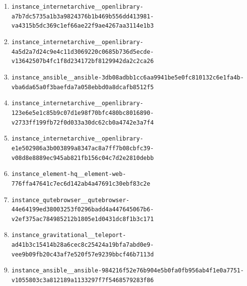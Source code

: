 \begin{enumerate}
\item \texttt{instance\_\allowbreak{}internetarchiv\allowbreak{}e\_\allowbreak{}\_\allowbreak{}openlibrary-\allowbreak{}a7b7dc5735a1b3\allowbreak{}a9824376b1b469\allowbreak{}b556dd413981-\allowbreak{}va4315b5dc369c\allowbreak{}1ef66ae22f9ae4\allowbreak{}267aa3114e1b3}
\item \texttt{instance\_\allowbreak{}internetarchiv\allowbreak{}e\_\allowbreak{}\_\allowbreak{}openlibrary-\allowbreak{}4a5d2a7d24c9e4\allowbreak{}c11d3069220c06\allowbreak{}85b736d5ecde-\allowbreak{}v13642507b4fc1\allowbreak{}f8d234172bf812\allowbreak{}9942da2c2ca26}
\item \texttt{instance\_\allowbreak{}ansible\_\allowbreak{}\_\allowbreak{}ansible-\allowbreak{}3db08adbb1cc6a\allowbreak{}a9941be5e0fc81\allowbreak{}0132c6e1fa4b-\allowbreak{}vba6da65a0f3ba\allowbreak{}efda7a058ebbd0\allowbreak{}a8dcafb8512f5}
\item \texttt{instance\_\allowbreak{}internetarchiv\allowbreak{}e\_\allowbreak{}\_\allowbreak{}openlibrary-\allowbreak{}123e6e5e1c85b9\allowbreak{}c07d1e98f70bfc\allowbreak{}480bc8016890-\allowbreak{}v2733ff199fb72\allowbreak{}f0d033a30dc62c\allowbreak{}b0a4742e3a7f4}
\item \texttt{instance\_\allowbreak{}internetarchiv\allowbreak{}e\_\allowbreak{}\_\allowbreak{}openlibrary-\allowbreak{}e1e502986a3b00\allowbreak{}3899a8347ac8a7\allowbreak{}ff7b08cbfc39-\allowbreak{}v08d8e8889ec94\allowbreak{}5ab821fb156c04\allowbreak{}c7d2e2810debb}
\item \texttt{instance\_\allowbreak{}element-\allowbreak{}hq\_\allowbreak{}\_\allowbreak{}element-\allowbreak{}web-\allowbreak{}776ffa47641c7e\allowbreak{}c6d142ab4a4769\allowbreak{}1c30ebf83c2e}
\item \texttt{instance\_\allowbreak{}qutebrowser\_\allowbreak{}\_\allowbreak{}qutebrowser-\allowbreak{}44e64199ed3800\allowbreak{}3253f0296badd4\allowbreak{}a447645067b6-\allowbreak{}v2ef375ac78498\allowbreak{}5212b1805e1d04\allowbreak{}31dc8f1b3c171}
\item \texttt{instance\_\allowbreak{}gravitational\_\allowbreak{}\_\allowbreak{}teleport-\allowbreak{}ad41b3c15414b2\allowbreak{}8a6cec8c25424a\allowbreak{}19bfa7abd0e9-\allowbreak{}vee9b09fb20c43\allowbreak{}af7e520f57e923\allowbreak{}9bbcf46b7113d}
\item \texttt{instance\_\allowbreak{}ansible\_\allowbreak{}\_\allowbreak{}ansible-\allowbreak{}984216f52e76b9\allowbreak{}04e5b0fa0fb956\allowbreak{}ab4f1e0a7751-\allowbreak{}v1055803c3a812\allowbreak{}189a1133297f7f\allowbreak{}5468579283f86}

\end{enumerate}
